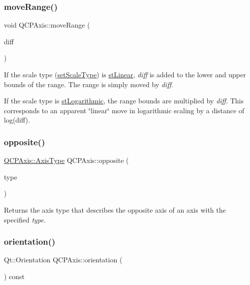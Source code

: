 \subsubsection{\texorpdfstring{move\+Range()}{moveRange()}}
{\footnotesize\ttfamily void Q\+C\+P\+Axis\+::move\+Range (\begin{DoxyParamCaption}\item[{double}]{diff }\end{DoxyParamCaption})}

If the scale type (\hyperlink{class_q_c_p_axis_adef29cae617af4f519f6c40d1a866ca6}{set\+Scale\+Type}) is \hyperlink{class_q_c_p_axis_a36d8e8658dbaa179bf2aeb973db2d6f0ac2a013f86793dd3cd879bae4c4a3a29d}{st\+Linear}, {\itshape diff} is added to the lower and upper bounds of the range. The range is simply moved by {\itshape diff}.

If the scale type is \hyperlink{class_q_c_p_axis_a36d8e8658dbaa179bf2aeb973db2d6f0af4ca9655d4e466545bc14bddb8663c8e}{st\+Logarithmic}, the range bounds are multiplied by {\itshape diff}. This corresponds to an apparent \char`\"{}linear\char`\"{} move in logarithmic scaling by a distance of log(diff). \mbox{\label{class_q_c_p_axis_aa85ba73dfee6483e23825461b725e363}} 
\subsubsection{\texorpdfstring{opposite()}{opposite()}}
{\footnotesize\ttfamily \hyperlink{class_q_c_p_axis_ae2bcc1728b382f10f064612b368bc18a}{Q\+C\+P\+Axis\+::\+Axis\+Type} Q\+C\+P\+Axis\+::opposite (\begin{DoxyParamCaption}\item[{\hyperlink{class_q_c_p_axis_ae2bcc1728b382f10f064612b368bc18a}{Q\+C\+P\+Axis\+::\+Axis\+Type}}]{type }\end{DoxyParamCaption})\hspace{0.3cm}{\ttfamily [static]}}

Returns the axis type that describes the opposite axis of an axis with the specified {\itshape type}. \mbox{\label{class_q_c_p_axis_ab988ef4538e2655bb77bd138189cd42e}} 
\subsubsection{\texorpdfstring{orientation()}{orientation()}\hspace{0.1cm}{\footnotesize\ttfamily [1/2]}}
{\footnotesize\ttfamily Qt\+::\+Orientation Q\+C\+P\+Axis\+::orientation (\begin{DoxyParamCaption}{ }\end{DoxyParamCaption}) const\hspace{0.3cm}{\ttfamily [inline]}}

